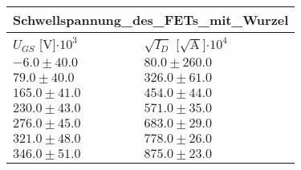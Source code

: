 \documentclass{article}
\begin{document}
\begin{tabular}{|p{3cm}|p{3cm}|}
\hline
\multicolumn{2}{|c|}{Schwellspannung_des_FETs_mit_Wurzel}\\
\hline
$U_{GS}$ [V]$\cdot 10^{3}$&$\sqrt{I_D}$ [$\sqrt{\text{A}}$]$\cdot 10^{4}$\\
\hline
$-6.0\pm40.0$&$80.0\pm 260.0$\\
$79.0\pm40.0$&$326.0\pm 61.0$\\
$165.0\pm41.0$&$454.0\pm 44.0$\\
$230.0\pm43.0$&$571.0\pm 35.0$\\
$276.0\pm45.0$&$683.0\pm 29.0$\\
$321.0\pm48.0$&$778.0\pm 26.0$\\
$346.0\pm51.0$&$875.0\pm 23.0$\\
\hline
\end{tabular}
\end{document}

